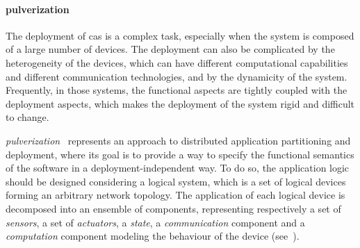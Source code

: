 \documentclass[12pt]{article}
\begin{document}
\paragraph{pulverization}
The deployment of \ac{cas} is a complex task,
especially when the system is composed of a large number of devices.
%
The deployment can also be complicated by the heterogeneity of the devices,
which can have different computational capabilities and different communication technologies, 
and by the dynamicity of the system.
%
Frequently,
in those systems,
the functional aspects are tightly coupled with the deployment aspects,
which makes the deployment of the system rigid and difficult to change.

\emph{pulverization}~\cite{DBLP:journals/fi/CasadeiPPVW20} represents an approach to distributed application partitioning and deployment,
where its goal is to provide a way to specify the functional semantics of the software in a deployment-independent way.
%
To do so,
the application logic should be designed considering a logical system,
which is a set of logical devices forming an arbitrary network topology.
%
The application of each logical device is decomposed into an ensemble of components,
representing respectively a set of \emph{sensors},
a set of \emph{actuators},
a \emph{state},
a \emph{communication} component and a \emph{computation} component modeling the behaviour of the device (see~).
%
\end{document}

